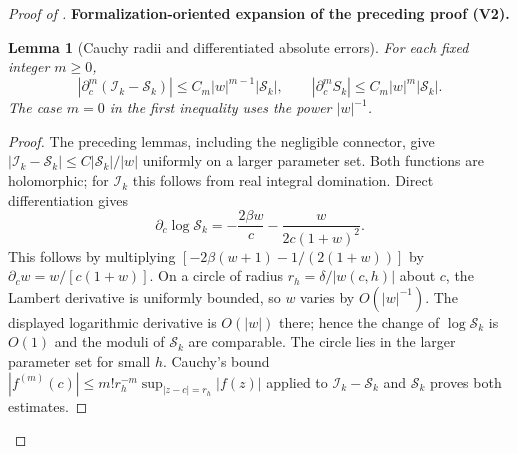 \documentclass[11pt]{article}
\newtheorem{lemma}[theorem]{Lemma}
\newcommand{\formalisationparentid}{X}
\newenvironment{formalisationaddition}[1]{\par\medskip\begingroup\color{blue}\def\formalisationparentid{#1}\setcounter{formalizationsublemma}{0}\let\lemma\formalizationsublemma\let\endlemma\endformalizationsublemma
  \def\Eo{\mathcal E_h^\circ}\def\EE{\mathcal E_h}\def\phio{\phi_h^\circ}\def\phih{\phi_h}\def\Ho{H_h^{\rm atom}(v^\circ)}\def\Ha{H_h^{\rm atom}}\def\HL{H_h^{L}}\def\Dh{D_h}\def\Log{\operatorname{Log}}\def\ellh{\ell_h}\def\Gp{G_{p,h}}\def\Ast{A_{*,h}}\def\ahat{\widehat{\mathfrak a}_h}\def\ah{\mathfrak a_h}\def\rh{\widehat\rho_h}\def\deltah{\widehat\delta_h}\def\oldref##1{\textup{(##1)}}\def\interface##1{\par\noindent\textit{Analytical interface used here.} ##1\par}\def\finish{\par\noindent\textit{Conclusion of the formalization-oriented expansion.} }\par\noindent\textbf{Formalization-oriented expansion of the preceding proof (V2).}\par\smallskip
}{\par\endgroup\medskip
}
\begin{document}
\begin{proof}[Proof of ]
\begin{formalisationaddition}{D-T6.4}
\begin{lemma}[Cauchy radii and differentiated absolute errors]\label{sublemma:D6-4-cauchy-derivatives}
For each fixed integer $m\ge0$,
\[
 |\partial_c^m(\mathcal I_k-\mathcal S_k)|\le C_m|w|^{m-1}|\mathcal S_k|,\qquad
 |\partial_c^mS_k|\le C_m|w|^m|\mathcal S_k|.
\]
The case $m=0$ in the first inequality uses the power $|w|^{-1}$.
\end{lemma}
\begin{proof}
The preceding lemmas, including the negligible connector, give
$|\mathcal I_k-\mathcal S_k|\le C|\mathcal S_k|/|w|$ uniformly on a larger parameter set.
Both functions are holomorphic; for $\mathcal I_k$ this follows from real
integral domination. Direct differentiation gives
\[
 \partial_c\log \mathcal S_k=-\frac{2\beta w}{c}
                    -\frac{w}{2c(1+w)^2}.
\]
This follows by multiplying
$[-2\beta(w+1)-1/(2(1+w))]$ by
$\partial_cw=w/[c(1+w)]$.
On a circle of radius $r_h=\delta/|w(c,h)|$ about $c$, the Lambert
derivative is uniformly bounded, so $w$ varies by $O(|w|^{-1})$.
The displayed logarithmic derivative is $O(|w|)$ there; hence the
change of $\log \mathcal S_k$ is $O(1)$ and the moduli of $\mathcal S_k$ are comparable.
The circle lies in the larger parameter set for small $h$.
Cauchy's bound $|f^{(m)}(c)|\le m!r_h^{-m}\sup_{|z-c|=r_h}|f(z)|$
applied to $\mathcal I_k-\mathcal S_k$ and $\mathcal S_k$ proves both estimates.
\end{proof}


\end{formalisationaddition}
\end{proof}
\end{document}
